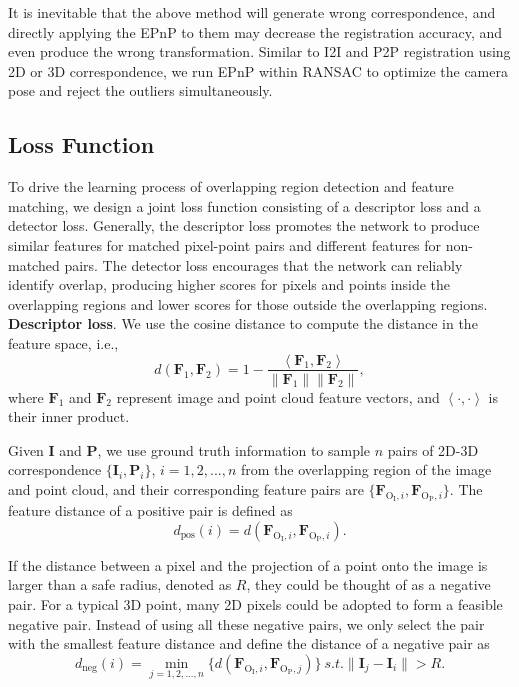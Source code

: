 \documentclass[lettersize,journal]{IEEEtran}
\begin{document}
It is inevitable that the above method will generate wrong correspondence, and directly applying the EPnP to them may decrease the registration accuracy, and even produce the wrong transformation. Similar to I2I and P2P registration using 2D or 3D correspondence, we run EPnP within RANSAC to optimize the camera pose and reject the outliers simultaneously. 

\subsection{Loss Function}
To drive the learning process of overlapping region detection and feature matching, we design a joint loss function consisting of a descriptor loss and a detector loss.  Generally, the descriptor loss promotes the network to produce similar features for matched pixel-point pairs and different features for non-matched pairs.
The detector loss encourages that the network can reliably identify overlap, producing higher scores for pixels and points inside the overlapping regions and lower scores for those outside the overlapping regions.\\

\noindent\textbf{Descriptor loss}. 
We use the cosine distance to compute the distance in the feature space, i.e., 
\begin{equation}
    d(\mathbf{F}_{1},\mathbf{F}_{2})=1-\frac{\left< \mathbf{F}_{1},\mathbf{F}_{2}\right>}{\|\mathbf{F}_{1}\|\|\mathbf{F}_{2}\|},
\end{equation}
where $\mathbf{F}_{1}$ and $\mathbf{F}_{2}$ represent image and point cloud feature vectors, and $\left<\cdot,\cdot\right>$ is their inner product.

Given  $\mathbf{I}$ and   $\mathbf{P}$, we use ground truth information to sample $n$ pairs of 2D-3D correspondence $\{\mathbf{I}_i,\mathbf{P}_i\}$, $i=1,2,...,n$ from the overlapping region of the image and point cloud, and their corresponding feature pairs are $\{\mathbf{F}_{\text{O}_{\text{I}},i},\mathbf{F}_{\text{O}_{\text{P}},i}\}$.
The feature distance of a positive pair is defined as
\begin{equation}
d_{\text{pos}}(i)=d(\mathbf{F}_{{\text{O}_{\text{I}}},i},\mathbf{F}_{{\text{O}_{\text{P}}},i}).
\end{equation}

If the distance between a pixel and the projection of a point onto the image is larger than a safe radius, denoted as $R$, they could be thought of as a negative pair. For a typical 3D point, many 2D pixels could be adopted to form a feasible negative pair.
Instead of using all these negative pairs, we only select the pair with the smallest feature distance and define the distance of a negative pair  as
\begin{equation}
d_{\text{neg}}(i)=\mathop{\min}_{j=1,2,...,n}\{d(\mathbf{F}_{{\text{O}_{\text{I}}},i},\mathbf{F}_{{\text{O}_{\text{P}}},j})\}\ s.t.\|\mathbf{I}_j-\mathbf{I}_i\|>R.
 \end{equation}
\end{document}
